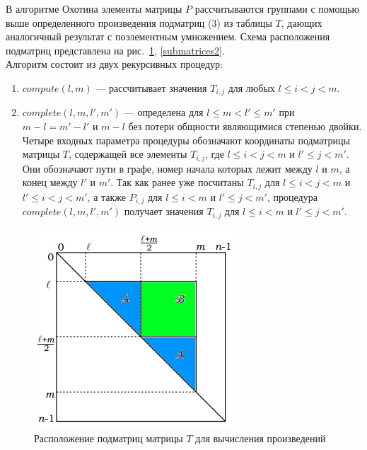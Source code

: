 \documentclass{spbau-diploma}
\begin{document}
В алгоритме Охотина элементы матрицы $P$ рассчитываются
группами с помощью выше определенного произведения
подматриц (3) из таблицы $T$, дающих аналогичный результат с
поэлементным умножением. Схема расположения подматриц
представлена на рис.~\ref{submatrices1},  \ref{submatrices2}.
\\Алгоритм состоит из двух рекурсивных процедур:
\begin{enumerate}
\item $compute(l, m)$ --- рассчитывает значения $T_{i,j}$ для любых $l \le i < j < m$.
\item $complete(l, m, l', m')$ --- определена для $l \le m < l' \le m'$ при $m − l = m' − l'$ и $m - l$ без потери общности являющимися степенью двойки.
\\Четыре входных параметра процедуры обозначают координаты
подматрицы матрицы $T$, содержащей все элементы $T_{i,j}$, где $l \le i < j < m$ и $l' \le j < m'$. Они обозначают пути в графе, номер начала которых лежит между $l$ и $m$, а конец между $l'$ и $m'$. Так как ранее уже посчитаны $T_{i,j}$ для $l \le i < j < m$ и $l' \le i < j < m'$, а также $P_{i,j}$ для $l \le i < m$ и $l' \le j < m'$, процедура $complete(l, m, l', m')$ получает значения $T_{i,j}$ для $l \le i < m$ и $l' \le j < m'$.
\end{enumerate}
\begin{figure}
\centering
\includegraphics{subm1.png}
\caption{Расположение подматриц матрицы $T$ для вычисления произведений}
\label{submatrices1}
\end{figure}
\end{document}
